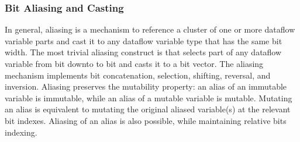 \subsubsection{Bit Aliasing and Casting} 
In general, aliasing is a mechanism to reference a cluster of one or more dataflow variable parts and cast it to any dataflow variable type that has the same bit width. The most trivial aliasing construct is  that selects part of any dataflow variable from bit  downto to bit  and casts it to a bit vector. The aliasing mechanism implements bit concatenation, selection, shifting, reversal, and inversion. Aliasing preserves the mutability property: an alias of an immutable variable is immutable, while an alias of a mutable variable is mutable. Mutating an alias is equivalent to mutating the original aliased variable(s) at the relevant bit indexes. Aliasing of an alias is also possible, while maintaining relative bits indexing.  

